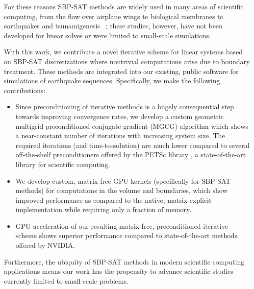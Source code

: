For these reasons SBP-SAT methods are widely used in many areas of scientific computing, from the flow over airplane wings to biological membranes to earthquakes and tsunamigenesis ~\cite{Ying2007, NordstromEriksson2010, Swim2011, petersson_stable, Lotto2015, EricksonDay2016}; these studies, however, have not been developed for linear solves or were limited to small-scale simulations. 


With this work, we contribute a novel iterative scheme for linear systems based on SBP-SAT discretizations where nontrivial computations arise due to boundary treatment. These methods are integrated into our existing, public software for simulations of earthquake sequences. Specifically, we make the following contributions: 
\begin{itemize}
\item Since preconditioning of iterative methods is a hugely consequential step towards improving convergence rates, we develop a custom geometric multigrid preconditioned conjugate gradient (MGCG) algorithm which shows a near-constant number of iterations with increasing system size. The required iterations (and time-to-solution) are much lower compared to several off-the-shelf preconditioners offered by the PETSc library \cite{petsc-web-page}, a state-of-the-art library for scientific computing.
\item We develop custom, matrix-free GPU kernels (specifically for SBP-SAT methods) for computations in the volume and boundaries, which show improved performance as compared to the native, matrix-explicit implementation while requiring only a fraction of memory. 
\item GPU-acceleration of our resulting matrix-free, preconditioned iterative scheme shows superior performance compared to state-of-the-art methods offered by NVIDIA.
\end{itemize} 
%
Furthermore, the ubiquity of SBP-SAT methods in modern scientific computing applications means our work has the propensity to advance scientific studies currently limited to small-scale problems.

